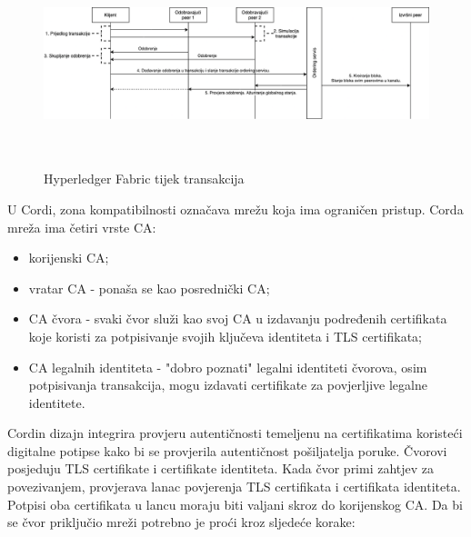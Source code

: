 \documentclass[times, utf8, diplomski]{fer}
\begin{document}
\begin{figure}[htb]
\centering
\includegraphics[width=15cm, height=6cm]{imgs/Tx Flow.png}
\caption{Hyperledger Fabric tijek transakcija}
\label{fig:fabrictxflow}
\end{figure}

U Cordi, zona kompatibilnosti označava mrežu koja ima ograničen pristup. Corda mreža ima četiri vrste CA:

\begin{itemize}

\item korijenski CA;

\item vratar CA - ponaša se kao posrednički CA;

\item CA čvora - svaki čvor služi kao svoj CA u izdavanju podređenih certifikata koje koristi za potpisivanje svojih ključeva identiteta i TLS certifikata;

\item CA legalnih identiteta - "dobro poznati" legalni identiteti čvorova, osim potpisivanja transakcija, mogu izdavati certifikate za povjerljive legalne identitete.

\end{itemize}

Cordin dizajn integrira provjeru autentičnosti temeljenu na certifikatima koristeći digitalne potipse kako bi se provjerila autentičnost pošiljatelja poruke. Čvorovi posjeduju TLS certifikate i certifikate identiteta. Kada čvor primi zahtjev za povezivanjem, provjerava lanac povjerenja TLS certifikata i certifikata identiteta. Potpisi oba certifikata u lancu moraju biti valjani skroz do korijenskog CA. Da bi se čvor priključio mreži potrebno je proći kroz sljedeće korake:
\end{document}
